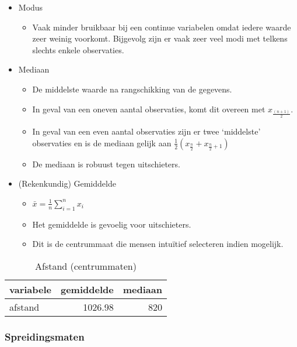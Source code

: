 \documentclass[]{memoir}
\providecommand{\tightlist}{%
  \setlength{\itemsep}{0pt}\setlength{\parskip}{0pt}}
\begin{document}
\begin{itemize}
\tightlist
\item
  Modus

  \begin{itemize}
  \tightlist
  \item
    Vaak minder bruikbaar bij een continue variabelen omdat iedere
    waarde zeer weinig voorkomt. Bijgevolg zijn er vaak zeer veel modi
    met telkens slechts enkele observaties.
  \end{itemize}
\item
  Mediaan

  \begin{itemize}
  \tightlist
  \item
    De middelste waarde na rangschikking van de gegevens.
  \item
    In geval van een oneven aantal observaties, komt dit overeen met
    \(x_{\frac{(n+1)}{2}}\).
  \item
    In geval van een even aantal observaties zijn er twee `middelste'
    observaties en is de mediaan gelijk aan
    \(\frac{1}{2}( x_{\frac{n}{2}}+x_{\frac{n}{2}+1})\)
  \item
    De mediaan is robuust tegen uitschieters.
  \end{itemize}
\item
  (Rekenkundig) Gemiddelde

  \begin{itemize}
  \tightlist
  \item
    \(\bar{x} = \frac{1}{n}\sum_{i=1}^n x_i\)
  \item
    Het gemiddelde is gevoelig voor uitschieters.
  \item
    Dit is de centrummaat die mensen intuïtief selecteren indien
    mogelijk.
  \end{itemize}
\end{itemize}

\begin{table}[t]

\caption{\label{tab:4-9}Afstand (centrummaten)}
\centering
\fontsize{10}{12}\selectfont
\begin{tabular}{lrr}
\toprule
variabele & gemiddelde & mediaan\\
\midrule
afstand & 1026.98 & 820\\
\bottomrule
\end{tabular}
\end{table}

\subsubsection*{Spreidingsmaten}\label{spreidingsmaten-1}
\end{document}
